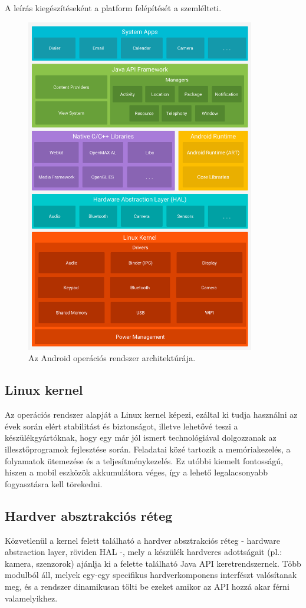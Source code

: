 A leírás kiegészítéseként a platform felépítését a  szemlélteti.
\begin{figure}[!ht]
	\centering
	\includegraphics[width=100mm, keepaspectratio]{figures/android-stack_2x.png}
	\caption{Az Android operációs rendszer architektúrája.}
	\label{fig:AndroidPlatform}
\end{figure}

\subsection{Linux kernel}
Az operációs rendszer alapját a Linux kernel képezi, ezáltal ki tudja használni az évek során elért stabilitást és biztonságot, illetve lehetővé teszi a készülékgyártóknak, hogy egy már jól ismert technológiával dolgozzanak az illesztőprogramok fejlesztése során. Feladatai közé tartozik a memóriakezelés, a folyamatok ütemezése és a teljesítménykezelés. Ez utóbbi kiemelt fontosságú, hiszen a mobil eszközök akkumulátora véges, így a lehető legalacsonyabb fogyasztásra kell törekedni. \cite{MobWeb}

\subsection{Hardver absztrakciós réteg}
Közvetlenül a kernel felett található a hardver absztrakciós réteg - hardware abstraction layer, röviden HAL -, mely a készülék hardveres adottságait (pl.: kamera, szenzorok) ajánlja ki a felette található Java API keretrendszernek. Több modulból áll, melyek egy-egy specifikus hardverkomponens interfészt valósítanak meg, és a rendszer dinamikusan tölti be ezeket amikor az API hozzá akar férni valamelyikhez. \cite{PlatformGuide}

